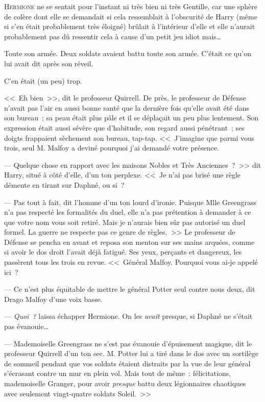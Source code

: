 
\lettrine{H}{ermione} ne se sentait pour l'instant ni très bien ni très Gentille, car une sphère de colère dont elle se demandait si cela ressemblait à l'obscurité de Harry (même si c'en était probablement très éloigné) brûlait à l'intérieur d'elle et elle n'aurait probablement pas dû ressentir cela à cause d'un petit jeu idiot mais…

Toute son armée. Deux soldats avaient battu toute son armée. C'était ce qu'on lui avait dit après son réveil.

C'en était (un peu) trop.

<<~Eh bien~>>, dit le professeur Quirrell. De près, le professeur de Défense n'avait pas l'air en aussi bonne santé que la dernière fois qu'elle avait été dans son bureau~; sa peau était plus pâle et il se déplaçait un peu plus lentement. Son expression était aussi sévère que d'habitude, son regard aussi pénétrant~; ses doigts frappaient sèchement son bureau, tap-tap. <<~J'imagine que parmi vous trois, seul M. Malfoy a deviné pourquoi j'ai demandé votre présence.

--- Quelque chose en rapport avec les maisons Nobles et Très Anciennes~?~>> dit Harry, situé à côté d'elle, d'un ton perplexe. <<~Je n'ai pas brisé une règle démente en tirant sur Daphné, ou si~?

--- Pas tout à fait, dit l'homme d'un ton lourd d'ironie. Puisque Mlle Greengrass n'a pas respecté les formalités du duel, elle n'a pas prétention à demander à ce que votre nom vous soit retiré. Mais je n'aurais bien sûr pas autorisé un duel formel. La guerre ne respecte pas ce genre de règles.~>> Le professeur de Défense se pencha en avant et reposa son menton sur ses mains arquées, comme si avoir le dos droit l'avait déjà fatigué. Ses yeux, perçants et dangereux, les passèrent tous les trois en revue. <<~Général Malfoy. Pourquoi vous ai-je appelé ici~?

--- Ce n'est plus équitable de mettre le général Potter seul contre nous deux, dit Drago Malfoy d'une voix basse.

--- \emph{Quoi~?} laissa échapper Hermione. On les \emph{avait} presque, si Daphné ne s'était pas évanouie…

--- Mademoiselle Greengrass ne s'est pas évanouie d'épuisement magique, dit le professeur Quirrell d'un ton sec. M. Potter lui a tiré dans le dos avec un sortilège de sommeil pendant que vos soldats étaient distraits par la vue de leur général s'écrasant contre un mur en plein vol. Mais tout de même~: félicitations, mademoiselle Granger, pour avoir \emph{presque} battu deux légionnaires chaotiques avec seulement vingt-quatre soldats Soleil.~>>

